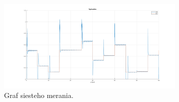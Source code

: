 \documentclass{article}
\begin{document}
\begin{figure}[!htbp]
	\begin{center}
		\includegraphics[width=0.8\textwidth]{./include/m7.png}
	\end{center}
	\caption{Graf siesteho merania.}
	\label{fig:meranie6}
\end{figure}
\end{document}
